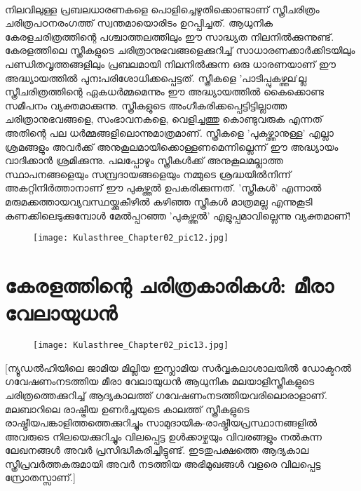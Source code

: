 \paragraph{}നിലവിലുള്ള പ്രബലധാരണകളെ പൊളിച്ചെഴുതിക്കൊണ്ടാണ് സ്ത്രീചരിത്രം ചരിത്രപഠനരംഗത്ത് സ്വന്തമായൊരിടം ഉറപ്പിച്ചത്. ആധുനിക കേരളചരിത്രത്തിന്റെ പശ്ചാത്തലത്തിലും ഈ സാദ്ധ്യത നിലനിൽക്കുന്നുണ്ട്. കേരളത്തിലെ സ്ത്രീകളുടെ ചരിത്രാനുഭവങ്ങളെക്കുറിച്ച് സാധാരണക്കാർക്കിടയിലും പണ്ഡിതവൃത്തങ്ങളിലും പ്രബലമായി നിലനിൽക്കുന്ന ഒരു ധാരണയാണ് ഈ അദ്ധ്യായത്തിൽ പുനഃപരിശോധിക്കപ്പെട്ടത്. സ്ത്രീകളെ 'പാടിപ്പുകഴ്ത്തല'ല്ല സ്ത്രീചരിത്രത്തിന്റെ ഏകധർമ്മമെന്നും ഈ അദ്ധ്യായത്തിൽ കൈക്കൊണ്ട സമീപനം വ്യക്തമാക്കുന്നു. സ്ത്രീകളുടെ അംഗീകരിക്കപ്പെട്ടിട്ടില്ലാത്ത ചരിത്രാനുഭവങ്ങളെ, സംഭാവനകളെ, വെളിച്ചത്തു കൊണ്ടുവരുക എന്നത് അതിന്റെ പല ധർമ്മങ്ങളിലൊന്നുമാത്രമാണ്. സ്ത്രീകളെ 'പുകഴ്ത്താനുള്ള' എല്ലാ ശ്രമങ്ങളും അവർക്ക് അനുകൂലമായിക്കൊള്ളണമെന്നില്ലെന്ന് ഈ അദ്ധ്യായം വാദിക്കാൻ ശ്രമിക്കുന്നു. പലപ്പോഴും സ്ത്രീകൾക്ക് അനുകൂലമല്ലാത്ത സ്ഥാപനങ്ങളെയും സമ്പ്രദായങ്ങളെയും നമ്മുടെ ശ്രദ്ധയിൽനിന്ന് അകറ്റിനിർത്താനാണ് ഈ പുകഴ്ത്തൽ ഉപകരിക്കുന്നത്. 'സ്ത്രീകൾ' എന്നാൽ മരുമക്കത്തായവ്യവസ്ഥയ്ക്കുകീഴിൽ കഴിഞ്ഞ സ്ത്രീകൾ മാത്രമല്ല എന്നുകൂടി കണക്കിലെടുക്കുമ്പോൾ മേൽപ്പറഞ്ഞ 'പുകഴ്ത്തൽ' എളുപ്പമാവില്ലെന്നു വ്യക്തമാണ്! 
\begin{figure}[h]
\begin{center}
\texttt{[image: Kulasthree\_Chapter02\_pic12.jpg]}
\end{center}
\end{figure}


\section{കേരളത്തിന്റെ ചരിത്രകാരികൾ: മീരാ വേലായുധൻ}
\begin{figure}[h]
\begin{center}
\texttt{[image: Kulasthree\_Chapter02\_pic13.jpg]}
\end{center}
\end{figure}
[ന്യൂഡൽഹിയിലെ ജാമിയ മില്ലിയ ഇസ്ലാമിയ സർവ്വകലാശാലയിൽ ഡോക്ടറൽ ഗവേഷണംനടത്തിയ മീരാ വേലായുധൻ ആധുനിക മലയാളിസ്ത്രീകളുടെ ചരിത്രത്തെക്കുറിച്ച് ആദ്യകാലത്ത് ഗവേഷണംനടത്തിയവരിലൊരാളാണ്. മലബാറിലെ രാഷ്ട്രീയ ഉണർച്ചയുടെ കാലത്ത് സ്ത്രീകളുടെ രാഷ്ട്രീയപങ്കാളിത്തത്തെക്കുറിച്ചും സാമുദായിക-രാഷ്ട്രീയപ്രസ്ഥാനങ്ങളിൽ അവരുടെ നിലയെക്കുറിച്ചും വിലപ്പെട്ട ഉൾക്കാഴ്ചയും വിവരങ്ങളും നൽകുന്ന ലേഖനങ്ങൾ അവർ പ്രസിദ്ധീകരിച്ചിട്ടുണ്ട്. ഇടതുപക്ഷത്തെ ആദ്യകാല സ്ത്രീപ്രവർത്തകരുമായി അവർ നടത്തിയ അഭിമുഖങ്ങൾ വളരെ വിലപ്പെട്ട സ്രോതസ്സാണ്.]

